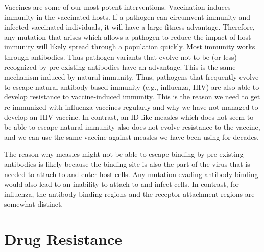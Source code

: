 \documentclass[]{book}
\theoremstyle{definition}
\theoremstyle{definition}
\theoremstyle{definition}
\theoremstyle{remark}
\begin{document}
Vaccines are some of our most potent interventions. Vaccination induces
immunity in the vaccinated hosts. If a pathogen can circumvent immunity
and infected vaccinated individuals, it will have a large fitness
advantage. Therefore, any mutation that arises which allows a pathogen
to reduce the impact of host immunity will likely spread through a
population quickly. Most immunity works through antibodies. Thus
pathogen variants that evolve not to be (or less) recognized by
pre-existing antibodies have an advantage. This is the same mechanism
induced by natural immunity. Thus, pathogens that frequently evolve to
escape natural antibody-based immunity (e.g., influenza, HIV) are also
able to develop resistance to vaccine-induced immunity. This is the
reason we need to get re-immunized with influenza vaccines regularly and
why we have not managed to develop an HIV vaccine. In contrast, an ID
like measles which does not seem to be able to escape natural immunity
also does not evolve resistance to the vaccine, and we can use the same
vaccine against measles we have been using for decades.

The reason why measles might not be able to escape binding by
pre-existing antibodies is likely because the binding site is also the
part of the virus that is needed to attach to and enter host cells. Any
mutation evading antibody binding would also lead to an inability to
attach to and infect cells. In contrast, for influenza, the antibody
binding regions and the receptor attachment regions are somewhat
distinct.

\section{Drug Resistance}\label{drug-resistance}
\end{document}
